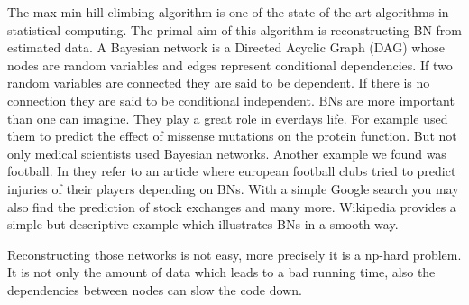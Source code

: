 The max-min-hill-climbing algorithm is one of the state of the art algorithms in statistical computing. The primal aim of this algorithm is reconstructing BN from estimated data. A Bayesian network is a Directed Acyclic Graph (DAG) whose nodes are random variables and edges represent conditional dependencies. If two random variables are connected they are said to be dependent. If there is no connection they are said to be conditional independent. BNs are more important than one can imagine. They play a great role in everdays life. For example \cite{NBBCW} used them to predict the effect of missense mutations on the protein function. But not only medical scientists used Bayesian networks. Another example we found was football. In \cite{PKA} they refer to an article where european football clubs tried to predict injuries of their players depending on BNs. With a simple Google search you may also find the prediction of stock exchanges and many more. Wikipedia provides a simple but descriptive example which illustrates BNs in a smooth way.


Reconstructing those networks is not easy, more precisely it is a np-hard problem. It is not only the amount of data which leads to a bad running time, also the dependencies between nodes can slow the code down.\\



